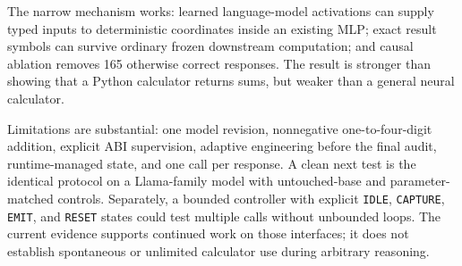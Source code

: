 \documentclass{article}
\begin{document}
The narrow mechanism works: learned language-model activations can supply
typed inputs to deterministic coordinates inside an existing MLP; exact result
symbols can survive ordinary frozen downstream computation; and causal
ablation removes 165 otherwise correct responses. The result is stronger than
showing that a Python calculator returns sums, but weaker than a general neural
calculator.

Limitations are substantial: one model revision, nonnegative one-to-four-digit
addition, explicit ABI supervision, adaptive engineering before the final
audit, runtime-managed state, and one call per response. A clean next test is
the identical protocol on a Llama-family model with untouched-base and
parameter-matched controls. Separately, a bounded controller with explicit
\texttt{IDLE}, \texttt{CAPTURE}, \texttt{EMIT}, and \texttt{RESET} states could
test multiple calls without unbounded loops. The current evidence supports
continued work on those interfaces; it does not establish spontaneous or
unlimited calculator use during arbitrary reasoning.
\end{document}
